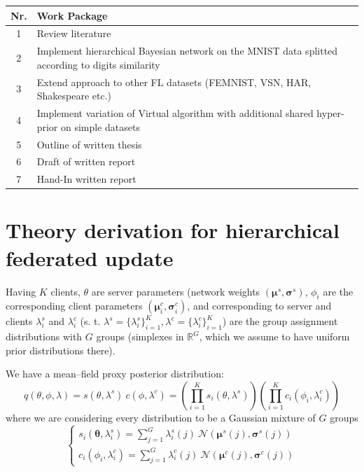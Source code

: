\documentclass{article}
\begin{document}
 \begin{center}
 {\def\arraystretch{1.2}\tabcolsep=10pt
 
	\begin{tabular}{c p{15cm}}
		\hline
		Nr. & Work Package \\
		\hline
		1 & Review literature  \\
		2 & Implement hierarchical Bayesian network on the MNIST data splitted according to digits similarity \\
        3 & Extend approach to other FL datasets (FEMNIST, VSN, HAR, Shakespeare etc.) \\
        4 & Implement variation of Virtual algorithm with additional shared hyper-prior on simple datasets \\
        5 & Outline of written thesis  \\
		6 & Draft of written report  \\
		7 & Hand-In written report \\
		\hline
	\end{tabular}
}
\end{center}
\section*{Theory derivation for hierarchical federated update}
Having $K$ clients, $\theta$ are server parameters (network weights $(\boldsymbol{\mu}^s, \boldsymbol{\sigma}^s)$, $\phi_i$ are the corresponding client parameters $(\boldsymbol{\mu}_i^c, \boldsymbol{\sigma}_i^c)$, and corresponding to server and clients $\lambda_i^s$ and $\lambda_i^c$ (s. t. $\lambda^s= \{\lambda_i^s\}_{i=1}^K, \lambda^c= \{\lambda_i^c\}_{i=1}^K$) are the group assignment distributions with $G$ groups (simplexes in $\mathbb{R}^G$, which we assume to have uniform prior distributions there).

We have a mean--field proxy posterior distribution:
$$q(\theta, \phi, \lambda )=s(\theta, \lambda^{s}) \: c(\phi, \lambda^{c})
=\left(\prod_{i=1}^{K} s_i\left(\theta, \lambda^{s}\right)\right)
\left(\prod_{i=1}^{K} c_{i}\left(\phi_{i}, \lambda_{i}^{c}\right)\right)$$
where we are considering every distribution to be a Gaussian mixture of $G$ groups
\begin{equation*}
  \begin{cases}
s_{i}\left(\boldsymbol{\theta}, \lambda_{i}^{s}\right)
= \sum_{j=1}^G \lambda_i^s(j) \:\mathcal{N}\left(\boldsymbol{\mu}^s(j), \boldsymbol{\sigma}^s(j)\right)\\
c_{i}\left(\phi_{i}, \lambda_{i}^{c}\right)
= \sum_{j=1}^G \lambda_i^c(j)\:\mathcal{N}\left(\boldsymbol{\mu}^c(j), \boldsymbol{\sigma}^c(j)\right)
\end{cases}  
\end{equation*}
\end{document}
